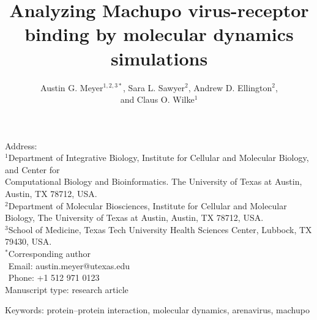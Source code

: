 \documentclass[12pt]{article}
\begin{document}
\title{\textbf{Analyzing Machupo virus-receptor binding by molecular dynamics simulations}}
\author{Austin G. Meyer$^{1,2,3*}$, Sara L. Sawyer$^{2}$, Andrew D. Ellington$^{2}$,\\and Claus O. Wilke$^{1}$}
\date{}

\maketitle
\noindent
Address:\\
$^1$Department of Integrative Biology, Institute for Cellular and Molecular
Biology, and Center for\\Computational Biology and Bioinformatics. The University
of Texas at Austin, Austin, TX 78712, USA.\\
$^2$Department of Molecular Biosciences, Institute for Cellular and Molecular 
Biology, The University of Texas at Austin, Austin, TX 78712, USA.\\
$^3$School of Medicine, Texas Tech University Health Sciences Center, 
Lubbock, TX 79430, USA.\\

\bigskip
\noindent
$^*$Corresponding author\\
$\phantom{^*}$Email: austin.meyer@utexas.edu\\
$\phantom{^*}$Phone: +1 512 971 0123\\

\bigskip
\noindent
Manuscript type: research article

\bigskip
\noindent Keywords: protein--protein interaction, molecular dynamics, arenavirus, machupo

\linenumbers
\end{document}
